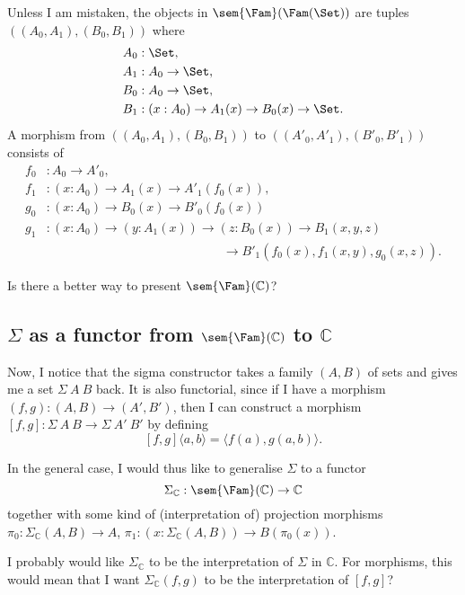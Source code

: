 \documentclass{article}
\begin{document}
\begin{example}[$\mathbb{C} = \Fam(\Set)$]
  Unless I am mistaken, the objects in $\sem{\Fam}(\Fam(\Set))$ are
  tuples $((A_0, A_1), (B_0, B_1))$ where
  \begin{align*}
    A_0 &: \Set, \\
    A_1 &: A_0 \to \Set, \\
    B_0 &: A_0 \to \Set, \\
    B_1 &: (x : A_0) \to A_1(x) \to  B_0(x) \to \Set.
  \end{align*}
 A morphism from $((A_0, A_1), (B_0, B_1))$ to
  $((A'_0, A'_1), (B'_0, B'_1))$ consists of 
  \begin{align*}
    f_0 &: A_0 \to A'_0, \\
    f_1 &: (x : A_0) \to A_1(x) \to A'_1(f_0(x)), \\
    g_0 &: (x : A_0) \to B_0(x) \to B'_0(f_0(x)) \\
    g_1 &: (x : A_0) \to (y : A_1(x)) \to (z : B_0(x)) \to B_1(x, y, z) \\
    & \qquad \qquad\qquad \qquad\qquad \qquad\qquad \to B'_1(f_0(x), f_1(x, y), g_0(x, z)).
  \end{align*}
\end{example}

\begin{question}
  Is there a better way to present $\sem{\Fam}(\mathbb{C})$?
\end{question}

\subsection{$\Sigma$ as a functor from $\sem{\Fam}(\mathbb{C})$ to $\mathbb{C}$}

Now, I notice that the sigma constructor takes a family $(A, B)$ of
sets and gives me a set $\Sigma\ A\ B$ back. It is also functorial,
since if I have a morphism $(f, g) : (A, B) \to (A', B')$, then I can
construct a morphism $[f, g] : \Sigma\ A\ B \to \Sigma\ A'\ B'$ by defining
\[
[f, g] \langle a, b\rangle = \langle f(a), g(a, b)\rangle.
\]

In the general case, I would thus like to generalise $\Sigma$ to a functor
\[
\Sigma_{\mathbb{C}} : \sem{\Fam}(\mathbb{C}) \to \mathbb{C}
\]
together with some kind of (interpretation of) projection morphisms \\
$\pi_0 : \Sigma_{\mathbb{C}}(A, B) \to A$, $\pi_1 : (x :
\Sigma_{\mathbb{C}}(A, B)) \to B(\pi_0(x))$.

\begin{question}
  I probably would like $\Sigma_{\mathbb{C}}$ to be the interpretation
  of $\Sigma$ in $\mathbb{C}$. For morphisms, this would mean that I
  want $\Sigma_{\mathbb{C}}(f,g)$ to be the interpretation of $[f,g]$?
\end{question}
\end{document}
